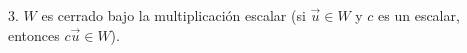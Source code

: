 \documentclass[preview]{standalone}
\begin{document}
\begin{center}
3. $W$ es cerrado bajo la multiplicación escalar (si $\vec{u} \in W$ y $c$ es un escalar, entonces $c\vec{u} \in W$).
\end{center}
\end{document}
